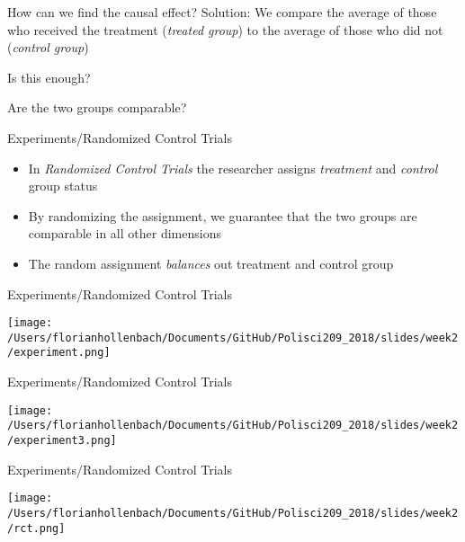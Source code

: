 \documentclass[presentation]{beamer}
\begin{document}
\begin{frame}[label={sec:orge5c307c}]{How can we find the causal effect?}
Solution: We compare the average of those who received the treatment (\emph{treated group}) to the average of those who did not (\emph{control group})
\pause


Is this enough?

\pause
Are the two groups comparable?
\end{frame}


\begin{frame}[label={sec:org71ee8e3}]{Experiments/Randomized Control Trials}
\begin{itemize}
\item In \emph{Randomized Control Trials} the researcher assigns \emph{treatment} and \emph{control} group status
\end{itemize}
\pause
\begin{itemize}
\item By randomizing the assignment, we guarantee that the two groups are comparable in all other dimensions
\item The random assignment \emph{balances} out treatment and control group
\end{itemize}
\end{frame}

\begin{frame}[label={sec:org6eb1fe1}]{Experiments/Randomized Control Trials}
\begin{center}
\texttt{[image: /Users/florianhollenbach/Documents/GitHub/Polisci209\_2018/slides/week2/experiment.png]}
\end{center}
\end{frame}


\begin{frame}[label={sec:org0e9204e}]{Experiments/Randomized Control Trials}
\begin{center}
\texttt{[image: /Users/florianhollenbach/Documents/GitHub/Polisci209\_2018/slides/week2/experiment3.png]}
\end{center}
\end{frame}


\begin{frame}[label={sec:org8de82a6}]{Experiments/Randomized Control Trials}
\begin{center}
\texttt{[image: /Users/florianhollenbach/Documents/GitHub/Polisci209\_2018/slides/week2/rct.png]}
\end{center}
\end{frame}
\end{document}

